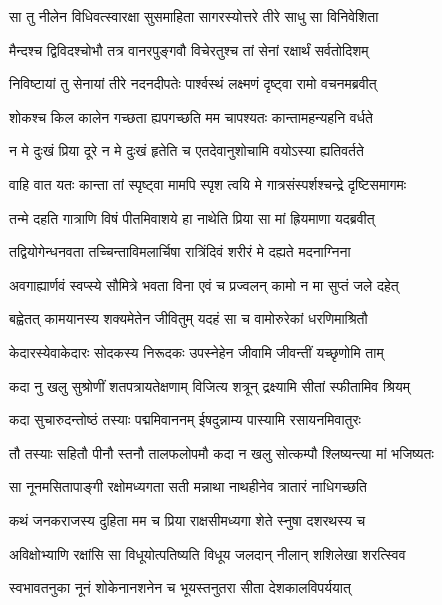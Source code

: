 
\twolineshloka
{सा तु नीलेन विधिवत्स्वारक्षा सुसमाहिता}
{सागरस्योत्तरे तीरे साधु सा विनिवेशिता} %

\twolineshloka
{मैन्दश्च द्विविदश्चोभौ तत्र वानरपुङ्गवौ}
{विचेरतुश्च तां सेनां रक्षार्थं सर्वतोदिशम्} %

\twolineshloka
{निविष्टायां तु सेनायां तीरे नदनदीपतेः}
{पार्श्वस्थं लक्ष्मणं दृष्ट्वा रामो वचनमब्रवीत्} %

\twolineshloka
{शोकश्च किल कालेन गच्छता ह्यपगच्छति}
{मम चापश्यतः कान्तामहन्यहनि वर्धते} %

\twolineshloka
{न मे दुःखं प्रिया दूरे न मे दुःखं हृतेति च}
{एतदेवानुशोचामि वयोऽस्या ह्यतिवर्तते} %

\twolineshloka
{वाहि वात यतः कान्ता तां स्पृष्ट्वा मामपि स्पृश}
{त्वयि मे गात्रसंस्पर्शश्चन्द्रे दृष्टिसमागमः} %

\twolineshloka
{तन्मे दहति गात्राणि विषं पीतमिवाशये}
{हा नाथेति प्रिया सा मां ह्रियमाणा यदब्रवीत्} %

\twolineshloka
{तद्वियोगेन्धनवता तच्चिन्ताविमलार्चिषा}
{रात्रिंदिवं शरीरं मे दह्यते मदनाग्निना} %

\twolineshloka
{अवगाह्यार्णवं स्वप्स्ये सौमित्रे भवता विना}
{एवं च प्रज्वलन् कामो न मा सुप्तं जले दहेत्} %

\twolineshloka
{बह्वेतत् कामयानस्य शक्यमेतेन जीवितुम्}
{यदहं सा च वामोरुरेकां धरणिमाश्रितौ} %

\twolineshloka
{केदारस्येवाकेदारः सोदकस्य निरूदकः}
{उपस्नेहेन जीवामि जीवन्तीं यच्छृणोमि ताम्} %

\twolineshloka
{कदा नु खलु सुश्रोणीं शतपत्रायतेक्षणाम्}
{विजित्य शत्रून् द्रक्ष्यामि सीतां स्फीतामिव श्रियम्} %

\twolineshloka
{कदा सुचारुदन्तोष्ठं तस्याः पद्ममिवाननम्}
{ईषदुन्नाम्य पास्यामि रसायनमिवातुरः} %

\twolineshloka
{तौ तस्याः सहितौ पीनौ स्तनौ तालफलोपमौ}
{कदा न खलु सोत्कम्पौ श्लिष्यन्त्या मां भजिष्यतः} %

\twolineshloka
{सा नूनमसितापाङ्गी रक्षोमध्यगता सती}
{मन्नाथा नाथहीनेव त्रातारं नाधिगच्छति} %

\twolineshloka
{कथं जनकराजस्य दुहिता मम च प्रिया}
{राक्षसीमध्यगा शेते स्नुषा दशरथस्य च} %

\twolineshloka
{अविक्षोभ्याणि रक्षांसि सा विधूयोत्पतिष्यति}
{विधूय जलदान् नीलान् शशिलेखा शरत्स्विव} %

\twolineshloka
{स्वभावतनुका नूनं शोकेनानशनेन च}
{भूयस्तनुतरा सीता देशकालविपर्ययात्} %

